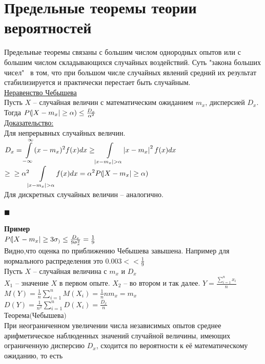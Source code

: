 \documentclass[russian, 12pt, fleqn]{article}
\begin{document}
\section{Предельные теоремы теории вероятностей}
Предельные теоремы связаны с большим числом однородных опытов или с большим числом складывающихся случайных воздействий. Суть "закона больших чисел"  \ в том, что при большом числе случайных явлений средний их результат стабилизируется и практически перестает быть случайным.\\
\underline{Неравенство Чебышева}\\
Пусть $X$ -- случайная величин с математическим ожиданием $m_x$, дисперсией $D_x$.\\
Тогда $P(\abs{X - m_x} \geq \alpha) \leq \frac{D_x}{\alpha^2}$\\
\underline{Доказательство:}\\
Для непрерывных случайных величин. \\
$D_x =  \displaystyle{\int\limits_{-\infty}^{\infty} }(x-m_x)^2 f(x) dx \geq \displaystyle{\int\limits_{\abs{x - m_x} > \alpha} } \abs{x-m_x}^2 f(x) dx$
$\geq  \\ \geq \alpha^2  \displaystyle{\int\limits_{\abs{x - m_x} > \alpha} }f(x) dx = \alpha^2 P(\abs{X - m_x} \geq \alpha)$ \\
Для дискретных случайных величин -- аналогично.\\
\begin{flushright}\(\blacksquare\)\end{flushright}
\textbf{Пример} \\
$P(\abs{X - m_x} \geq  3 \sigma_) \leq  \frac{D_x}{9\sigma_x^2} = \frac{1}{9}$\\
Видно,что оценка по  приближению Чебышева  завышена.  Например для нормального распределения это $0.003 << \frac{1}{9}$\\
Пусть $X$ -- случайная величина с $m_x$  и $D_x$\\
$X_1$ -- значение $X$ в первом опыте. $X_2$ -- во втором и так далее. $Y = \frac{\displaystyle{\sum\limits_{i = 1}  ^ {n} x_i}}{n}$ $M(Y) = \frac{1}{n} \displaystyle{\sum\limits_{i = 1}^{n}} M(X_i) = \frac{1}{n} n m_x = m_x$\\
$D(Y)  = \frac{1}{n^2}\displaystyle{\sum\limits_{i = 1}^{n}} D(X_i) = \frac{D_x}{n}$\\
$\textbf{Теорема(Чебышева)}$\\
При неограниченном увеличении числа независимых опытов среднее арифметическое наблюденных значений случайной величины, имеющих ограниченную дисперсию $D_x$, сходится по вероятности к её математическому ожиданию, то есть \\
\end{document}
